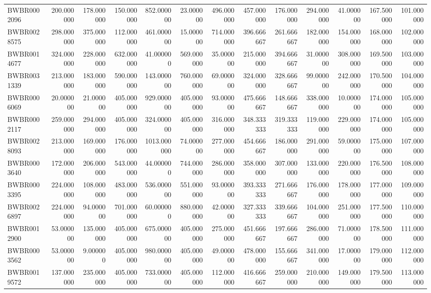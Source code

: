 \begin{longtable}{lrrrrrrrrrrrr}
BWBR0002096 & 200.000000 & 178.000000 & 150.000000 & 852.000000 & 23.000000 & 496.000000 & 457.000000 & 176.000000 & 294.000000 & 41.000000 & 167.500000 & 101.000000 \\
BWBR0028575 & 298.000000 & 375.000000 & 112.000000 & 461.000000 & 15.000000 & 714.000000 & 396.666667 & 261.666667 & 182.000000 & 154.000000 & 168.000000 & 102.000000 \\
BWBR0014677 & 324.000000 & 228.000000 & 632.000000 & 41.000000 & 569.000000 & 35.000000 & 215.000000 & 394.666667 & 31.000000 & 308.000000 & 169.500000 & 103.000000 \\
BWBR0031339 & 213.000000 & 183.000000 & 590.000000 & 143.000000 & 760.000000 & 69.000000 & 324.000000 & 328.666667 & 99.000000 & 242.000000 & 170.500000 & 104.000000 \\
BWBR0006069 & 20.000000 & 21.000000 & 405.000000 & 929.000000 & 405.000000 & 93.000000 & 475.666667 & 148.666667 & 338.000000 & 10.000000 & 174.000000 & 105.000000 \\
BWBR0002117 & 259.000000 & 294.000000 & 405.000000 & 324.000000 & 405.000000 & 316.000000 & 348.333333 & 319.333333 & 119.000000 & 229.000000 & 174.000000 & 105.000000 \\
BWBR0028093 & 213.000000 & 169.000000 & 176.000000 & 1013.000000 & 74.000000 & 277.000000 & 454.666667 & 186.000000 & 291.000000 & 59.000000 & 175.000000 & 107.000000 \\
BWBR0003640 & 172.000000 & 206.000000 & 543.000000 & 44.000000 & 744.000000 & 286.000000 & 358.000000 & 307.000000 & 133.000000 & 220.000000 & 176.500000 & 108.000000 \\
BWBR0003395 & 224.000000 & 108.000000 & 483.000000 & 536.000000 & 551.000000 & 93.000000 & 393.333333 & 271.666667 & 176.000000 & 178.000000 & 177.000000 & 109.000000 \\
BWBR0026897 & 224.000000 & 94.000000 & 701.000000 & 60.000000 & 880.000000 & 42.000000 & 327.333333 & 339.666667 & 104.000000 & 251.000000 & 177.500000 & 110.000000 \\
BWBR0012900 & 53.000000 & 135.000000 & 405.000000 & 675.000000 & 405.000000 & 275.000000 & 451.666667 & 197.666667 & 286.000000 & 71.000000 & 178.500000 & 111.000000 \\
BWBR0003562 & 53.000000 & 9.000000 & 405.000000 & 980.000000 & 405.000000 & 49.000000 & 478.000000 & 155.666667 & 341.000000 & 17.000000 & 179.000000 & 112.000000 \\
BWBR0019572 & 137.000000 & 235.000000 & 405.000000 & 733.000000 & 405.000000 & 112.000000 & 416.666667 & 259.000000 & 210.000000 & 149.000000 & 179.500000 & 113.000000 \\

\end{longtable}
